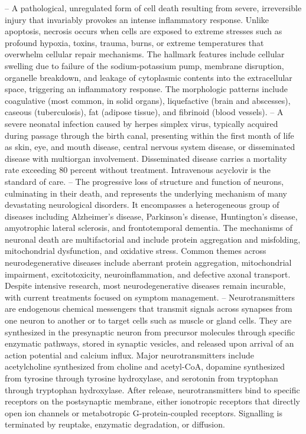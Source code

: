 -- A pathological, unregulated form of cell death resulting from severe, irreversible injury that invariably provokes an intense inflammatory response. Unlike apoptosis, necrosis occurs when cells are exposed to extreme stresses such as profound hypoxia, toxins, trauma, burns, or extreme temperatures that overwhelm cellular repair mechanisms. The hallmark features include cellular swelling due to failure of the sodium-potassium pump, membrane disruption, organelle breakdown, and leakage of cytoplasmic contents into the extracellular space, triggering an inflammatory response. The morphologic patterns include coagulative (most common, in solid organs), liquefactive (brain and abscesses), caseous (tuberculosis), fat (adipose tissue), and fibrinoid (blood vessels).
-- A severe neonatal infection caused by herpes simplex virus, typically acquired during passage through the birth canal, presenting within the first month of life as skin, eye, and mouth disease, central nervous system disease, or disseminated disease with multiorgan involvement. Disseminated disease carries a mortality rate exceeding 80 percent without treatment. Intravenous acyclovir is the standard of care.
-- The progressive loss of structure and function of neurons, culminating in their death, and represents the underlying mechanism of many devastating neurological disorders. It encompasses a heterogeneous group of diseases including Alzheimer's disease, Parkinson's disease, Huntington's disease, amyotrophic lateral sclerosis, and frontotemporal dementia. The mechanisms of neuronal death are multifactorial and include protein aggregation and misfolding, mitochondrial dysfunction, and oxidative stress. Common themes across neurodegenerative diseases include aberrant protein aggregation, mitochondrial impairment, excitotoxicity, neuroinflammation, and defective axonal transport. Despite intensive research, most neurodegenerative diseases remain incurable, with current treatments focused on symptom management.
-- Neurotransmitters are endogenous chemical messengers that transmit signals across synapses from one neuron to another or to target cells such as muscle or gland cells. They are synthesized in the presynaptic neuron from precursor molecules through specific enzymatic pathways, stored in synaptic vesicles, and released upon arrival of an action potential and calcium influx. Major neurotransmitters include acetylcholine synthesized from choline and acetyl-CoA, dopamine synthesized from tyrosine through tyrosine hydroxylase, and serotonin from tryptophan through tryptophan hydroxylase. After release, neurotransmitters bind to specific receptors on the postsynaptic membrane, either ionotropic receptors that directly open ion channels or metabotropic G-protein-coupled receptors. Signalling is terminated by reuptake, enzymatic degradation, or diffusion.
